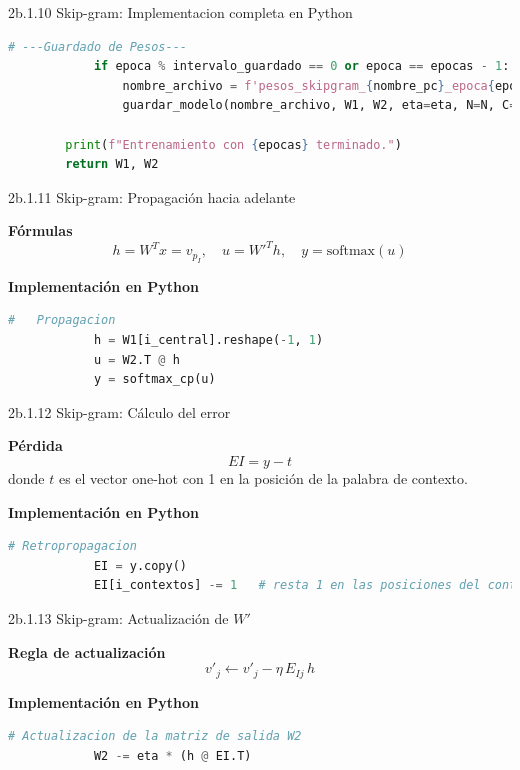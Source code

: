 \documentclass{beamer}
\begin{document}
\begin{frame}[fragile]{2b.1.10 Skip-gram: Implementacion completa en Python}
	
	\begin{block}{}
		\begin{lstlisting}[language=Python]
			# ---Guardado de Pesos---
			if epoca % intervalo_guardado == 0 or epoca == epocas - 1:
				nombre_archivo = f'pesos_skipgram_{nombre_pc}_epoca{epoca}.npz'
				guardar_modelo(nombre_archivo, W1, W2, eta=eta, N=N, C=C, cparray=True)
			
		print(f"Entrenamiento con {epocas} terminado.")
		return W1, W2                
		\end{lstlisting}
	\end{block}
\end{frame}

\begin{frame}[fragile]{2b.1.11 Skip-gram: Propagación hacia adelante}
	\begin{block}{\textbf{Fórmulas}}
		\[
		h = W^T x = v_{p_I}, \quad
		u = W'^T h, \quad
		y = \text{softmax}(u)
		\]
	\end{block}
	
	\begin{block}{\textbf{Implementación en Python}}
		\begin{lstlisting}[language=Python]
			#   Propagacion  
			h = W1[i_central].reshape(-1, 1)   
			u = W2.T @ h                        
			y = softmax_cp(u)                 
		\end{lstlisting}
	\end{block}
\end{frame}

\begin{frame}[fragile]{2b.1.12 Skip-gram: Cálculo del error}
	\begin{block}{\textbf{Pérdida}}
		\[
		EI = y - t
		\]
		donde $t$ es el vector one-hot con 1 en la posición de la palabra de contexto.
	\end{block}
	
	\begin{block}{\textbf{Implementación en Python}}
		\begin{lstlisting}[language=Python]
			# Retropropagacion 
			EI = y.copy()
			EI[i_contextos] -= 1   # resta 1 en las posiciones del contexto
		\end{lstlisting}
	\end{block}
\end{frame}

\begin{frame}[fragile]{2b.1.13 Skip-gram: Actualización de $W'$}
	\begin{block}{\textbf{Regla de actualización}}
		\[
		v'_j \leftarrow v'_j - \eta \, E_{Ij} \, h
		\]
	\end{block}
	
	\begin{block}{\textbf{Implementación en Python}}
		\begin{lstlisting}[language=Python]
			# Actualizacion de la matriz de salida W2
			W2 -= eta * (h @ EI.T)
		\end{lstlisting}
	\end{block}
\end{frame}
\end{document}
